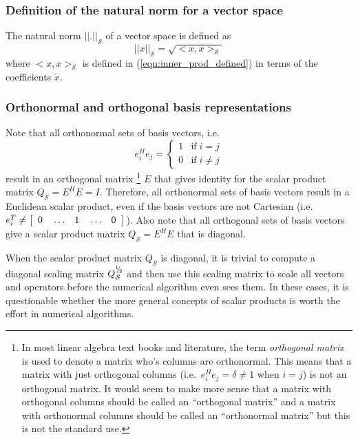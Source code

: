 \subsubsection{Definition of the natural norm for a vector space}

The natural norm $||.||_{\mathcal{S}}$ of a vector space is defined as
%
\begin{equation}
||x||_{\mathcal{S}} = \sqrt{<x,x>_{\mathcal{S}}}
\label{eqn:natural_norm_defined}
\end{equation}
%
where $<x,x>_{\mathcal{S}}$ is defined in (\ref{eqn:inner_prod_defined}) in
terms of the coefficients $\tilde{x}$.

\subsubsection{Orthonormal and orthogonal basis representations}

Note that all orthonormal sets of basis vectors, i.e.
\[
e_i^H e_j = \left\{ \begin{array}{ll} 1 & \mbox{if} \; i = j \\ 0 & \mbox{if} \; i \ne j \end{array}  \right.
\]
result in an orthogonal matrix
%
\footnote{In most linear algebra text books and
literature, the term {}\textit{orthogonal matrix} is used to denote a matrix
who's columns are orthonormal.  This means that a matrix with just orthogonal
columns (i.e.\ $e_i^H e_j = \delta \ne 1$ when $i=j$) is not an orthogonal
matrix.  It would seem to make more sense that a matrix with orthogonal
columns should be called an ``orthogonal matrix'' and a matrix with
orthonormal columns should be called an ``orthonormal matrix'' but this is not
the standard use.}
%
$E$ that gives identity for the scalar product matrix $Q_{\mathcal{S}} = E^H E
= I$.  Therefore, all orthonormal sets of basis vectors result in a Euclidean
scalar product, even if the basis vectors are not Cartesian (i.e.\ $e_i^T
{}\ne {\bmat{ccccc} 0 & {}\ldots & 1 & {}\ldots & 0 {}\emat}$). Also note that
all orthogonal sets of basis vectors give a scalar product matrix
$Q_{\mathcal{S}} = E^H E$ that is diagonal.

When the scalar product matrix $Q_{\mathcal{S}}$ is diagonal, it is trivial to
compute a diagonal scaling matrix $Q_{\mathcal{S}}^{\myonehalf}$ and then use
this scaling matrix to scale all vectors and operators before the numerical
algorithm even sees them.  In these cases, it is questionable whether the more
general concepts of scalar products is worth the effort in numerical
algorithms.


